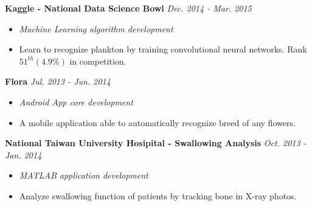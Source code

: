 \documentclass{joel_cv}
\begin{document}
\pagebreak


%
%

\vspace{1em}

%
\noindent \hspace{1.2em}
{\bf Kaggle - National Data Science Bowl} \hfill {\em Dec. 2014 - Mar. 2015}
\vspace{-0.5em}
\begin{itemize}[leftmargin=1.5em] \item[] {\em Machine Learning algorithm development} \end{itemize}
\vspace{-0.5em}
\begin{itemize}[leftmargin=1.5em]
	\itemsep=-0.5em
	\item[] Learn to recognize plankton by training convolutional neural networks. Rank $51^{th} (4.9\%)$ in competition.
\end{itemize}

%
\noindent \hspace{1.2em}
{\bf Flora} \hfill {\em Jul. 2013 - Jun. 2014}
\vspace{-0.5em}
\begin{itemize}[leftmargin=1.5em] \item[] {\em Android App core development} \end{itemize}
\vspace{-0.5em}
\begin{itemize}[leftmargin=1.5em]
	\itemsep=-0.5em
	\item[] A mobile application able to automatically recognize breed of any flowers.
\end{itemize}

%
\noindent \hspace{1.2em}
{\bf National Taiwan University Hosipital - Swallowing Analysis} \hfill {\em Oct. 2013 - Jan. 2014}
\vspace{-0.5em}
\begin{itemize}[leftmargin=1.5em] \item[] {\em MATLAB application development} \end{itemize}
\vspace{-0.5em}
\begin{itemize}[leftmargin=1.5em]
	\itemsep=-0.5em
	\item[] Analyze swallowing function of patients by tracking bone in X-ray photos.
\end{itemize}
\end{document}
